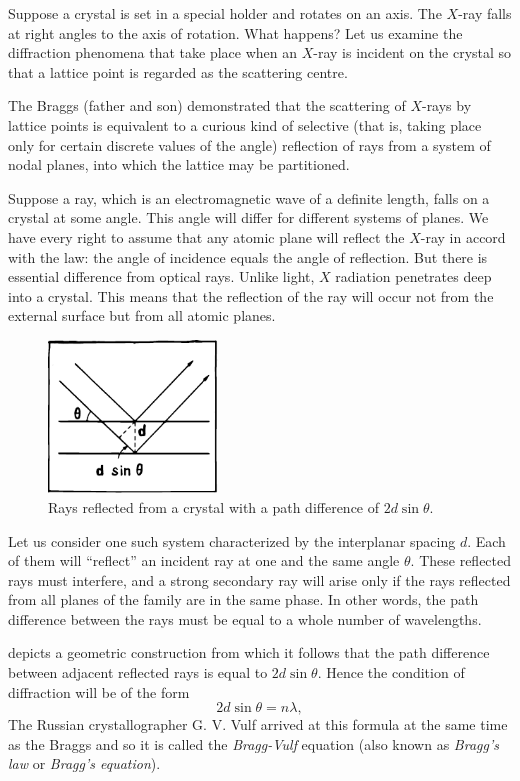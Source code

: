 Suppose a crystal is set in a special holder and rotates on an axis. The $X$-ray falls at right angles to the axis of rotation. What happens? Let us examine the diffraction phenomena that take place when an $X$-ray is incident on the crystal so that a lattice point is regarded as the scattering centre.

The Braggs (father and son) demonstrated that the scattering of $X$-rays by lattice points is equivalent to a curious kind of selective (that is, taking place only for certain discrete values of the angle) reflection of rays from a system of nodal planes, into which the lattice may be partitioned.

Suppose a ray, which is an electromagnetic wave of a definite length, falls on a crystal at some angle. This angle will differ for different systems of planes. We have every right to assume that any atomic plane will reflect the $X$-ray in accord with the law: the angle of incidence equals the angle of reflection. But there is essential dif­ference from optical rays. Unlike light, $X$ radiation pen­etrates deep into a crystal. This means that the reflec­tion of the ray will occur not from the external surface but from all atomic planes.

\begin{figure}[!ht]
\centering
\includegraphics[width=0.4\textwidth]{figures/fig-03-02.pdf}
\caption{Rays reflected from a crystal with a path difference of $2d \sin \theta$.}
\label{fig-3.2}
\end{figure}

Let us consider one such system characterized by the interplanar spacing $d$. Each of them will ``reflect'' an incident ray at one and the same angle $\theta$. These reflected rays must interfere, and a strong secondary ray will arise only if the rays reflected from all planes of the family are in the same phase. In other words, the path difference between the rays must be equal to a whole number of wavelengths.

 depicts a geometric construction from which it follows that the path difference between adjacent reflected rays is equal to $2d \sin \theta$. Hence the condition of diffraction will be of the form
\begin{equation*}%
2d \sin \theta = n \lambda,
\end{equation*}
The Russian crystallographer G. V. Vulf arrived at this formula at the same time as the Braggs and so it is called the \emph{Bragg-Vulf} equation (also known as \emph{Bragg's law} or \emph{Bragg's equation}).

